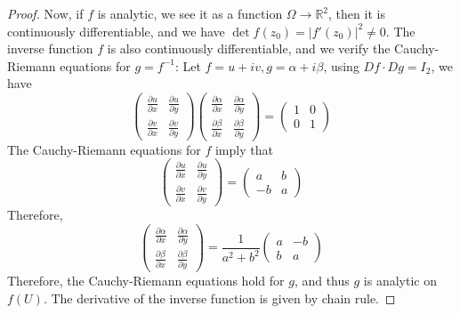 \documentclass[../main.tex]{subfiles}
\begin{document}
\begin{proof}
	Now, if $f$ is analytic, we see it as a function $\Omega \rightarrow \mathbb{R}^2$, then it is continuously differentiable, and we have $\det f(z_0) = \left|f'(z_0)\right|^2 \neq 0$. The inverse function $f$ is also continuously differentiable, and we verify the Cauchy-Riemann equations for $g = f^{-1}$: Let $f=u+iv,g=\alpha + i \beta$, using $Df \cdot Dg = I_2$, we have
	{\everymath{\displaystyle}
	\begin{equation*}
	\begin{pmatrix}
		\frac{\partial u}{\partial x} & \frac{\partial u}{\partial y} \\
		\frac{\partial v}{\partial x} & \frac{\partial v}{\partial y}
	\end{pmatrix}
	\begin{pmatrix}
		\frac{\partial \alpha}{\partial x} & \frac{\partial \alpha}{\partial y} \\
		\frac{\partial \beta}{\partial x} & \frac{\partial \beta}{\partial y}
	\end{pmatrix}=
	\begin{pmatrix}
		1 & 0 \\
		0 & 1
	\end{pmatrix}
	\end{equation*}
	The Cauchy-Riemann equations for $f$ imply that
	\begin{equation*}
	\begin{pmatrix}
		\frac{\partial u}{\partial x} & \frac{\partial u}{\partial y} \\
		\frac{\partial v}{\partial x} & \frac{\partial v}{\partial y}
	\end{pmatrix}=
	\begin{pmatrix}
		a&b\\
		-b&a
	\end{pmatrix}
	\end{equation*}
	Therefore,
	\begin{equation*}
	\begin{pmatrix}
		\frac{\partial \alpha}{\partial x} & \frac{\partial \alpha}{\partial y} \\
		\frac{\partial \beta}{\partial x} & \frac{\partial \beta}{\partial y}
	\end{pmatrix}= \frac{1}{a^2+b^2}
	\begin{pmatrix}
		a&-b\\
		b&a
	\end{pmatrix}
	\end{equation*}
}
Therefore, the Cauchy-Riemann equations hold for $g$, and thus $g$ is analytic on $f(U)$. The derivative of the inverse function is given by chain rule.
\end{proof}
\end{document}
